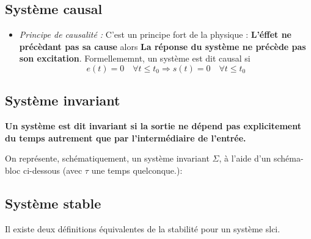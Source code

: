 \subsection{Système causal}
\begin{itemize}
    \item \emph{Principe de causalité :}
        C'est un principe fort de la physique :
        \textbf{\og L'éffet ne précèdant pas sa cause\fg} alors 
        \textbf{\og La réponse du système ne précède pas son excitation\fg}.
        Formellememnt, un système est dit causal si 
        $$e(t)=0\quad\forall t\le t_0 \Rightarrow s(t)=0\quad\forall t\le t_0$$
\end{itemize}

\subsection{Système invariant}
\textbf{Un système est dit invariant si la sortie ne dépend pas 
explicitement du temps autrement que par l'intermédiaire de l'entrée.}

On représente, schématiquement, un système invariant $\Sigma$, à 
l'aide d'un schéma-bloc ci-dessous 
(avec $\tau$ une temps quelconque.): 
\begin{center}

\end{center}

\subsection{Système stable}
Il existe deux définitions équivalentes de la stabilité pour un 
système \gls{slci}.

